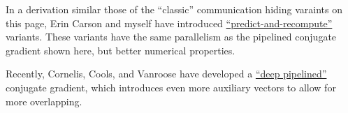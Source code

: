 \documentclass[10pt]{article}
\begin{document}
In a derivation similar those of the ``classic'' communication hiding varaints on this page, Erin Carson and myself have introduced \href{../publications/predict_and_recompute_cg.html}{``predict-and-recompute''} variants.
These variants have the same parallelism as the pipelined conjugate gradient shown here, but better numerical properties.

Recently, Cornelis, Cools, and Vanroose have developed a \href{https://arxiv.org/pdf/1801.04728.pdf}{``deep pipelined''} conjugate gradient, which introduces even more auxiliary vectors to allow for more overlapping.
\end{document}
